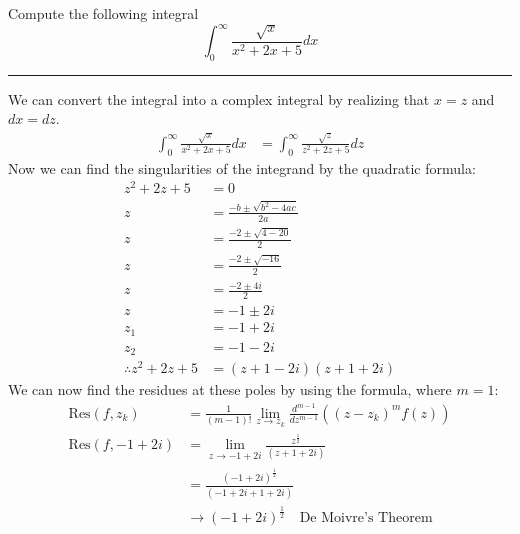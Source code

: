 \begin{example}
    Compute the following integral
    $$\int_0^\infty\frac{\sqrt{x}}{x^2+2x+5}dx$$

    \hrule
    \vspace{0.5cm}

    We can convert the integral into a complex integral by realizing that $x = z$ and $dx = dz$.
    \begin{align*}
        \int_0^\infty\frac{\sqrt{x}}{x^2+2x+5}dx & = \int_0^\infty\frac{\sqrt{z}}{z^2+2z+5}dz
    \end{align*}
    Now we can find the singularities of the integrand by the quadratic formula:
    \begin{align*}
        z^2 + 2z + 5            & = 0                              \\
        z                       & = \frac{-b\pm\sqrt{b^2-4ac}}{2a} \\
        z                       & = \frac{-2\pm\sqrt{4-20}}{2}     \\
        z                       & = \frac{-2\pm\sqrt{-16}}{2}      \\
        z                       & = \frac{-2\pm4i}{2}              \\
        z                       & = -1\pm2i                        \\
        z_1                     & = -1+2i                          \\
        z_2                     & = -1-2i                          \\
        \therefore z^2 + 2z + 5 & = (z + 1 - 2i)(z + 1 + 2i)
    \end{align*}
    We can now find the residues at these poles by using the formula, where $m = 1$:
    \begin{align*}
        \text{Res}(f, z_k)   & = \frac{1}{(m - 1)!}\lim_{z \to z_k} \frac{d^{m-1}}{dz^{m-1}} ((z - z_k)^m f(z))                                                   \\
        \text{Res}(f, -1+2i) & = \lim_{z \to -1+2i} \frac{z^\frac{1}{2}}{(z + 1 + 2i)}                                                                            \\
                             & = \frac{(-1+2i)^{\frac{1}{2}}}{(-1+2i + 1 + 2i)}                                                                                   \\
                             & \rightarrow (-1+2i)^{\frac{1}{2}} \quad \text{De Moivre's Theorem}                                                                 \\

\end{align*}
\end{example}
